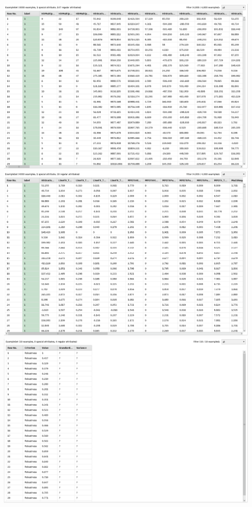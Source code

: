 \documentclass[12pt,ngerman,a4paperpaper,]{article}
\begin{document}
\includegraphics{aufg3/results-a.png}
\includegraphics{aufg3/results-b.png}
\includegraphics{aufg3/results-c.png}
\end{document}
